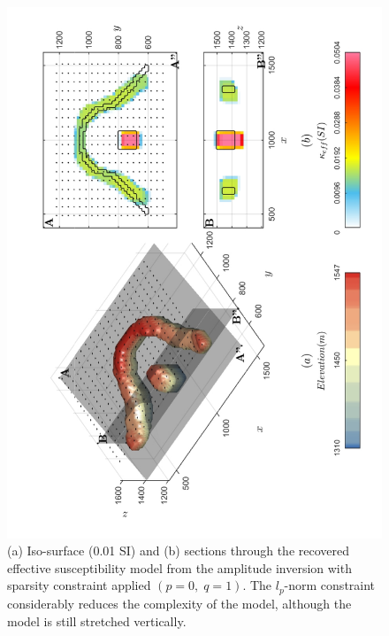 \begin{figure}[h!]
\centering
\includegraphics[scale=0.52, angle =270]{3D_Inv_l0l1_CMI_kEff.pdf}
\caption{ (a) Iso-surface (0.01 SI) and (b) sections through the recovered effective susceptibility model from the amplitude inversion with sparsity constraint applied $(p = 0,\; q = 1)$. The $l_p$-norm constraint considerably reduces the complexity of the model, although the model is still stretched vertically.}
\label{fig:3D_Inv_l0l1_CMI_kEff}
\end{figure}
